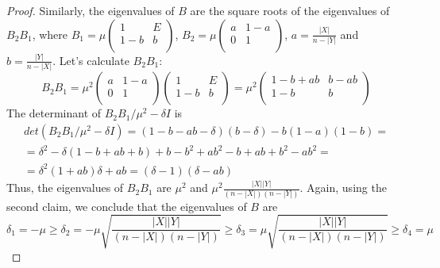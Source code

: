 \begin{problem}
\begin{sol}
\begin{proof}
            Similarly, the eigenvalues of $B$ are the square roots of the eigenvalues of $B_2 B_1$,
            where $B_1 = \mu
                \begin{pmatrix}
                    1     & E \\
                    1 - b & b \\
                \end{pmatrix}$, $B_2 = \mu
                \begin{pmatrix}
                    a & 1 - a \\
                    0 & 1     \\
                \end{pmatrix}$, $a = \frac{|X|}{n - |Y|}$ and $b = \frac{|Y|}{n - |X|}$.
            Let's calculate $B_2 B_1$:
            \[
                B_2 B_1 = \mu^2
                \begin{pmatrix}
                    a & 1 - a \\
                    0 & 1     \\
                \end{pmatrix}
                \begin{pmatrix}
                    1     & E \\
                    1 - b & b \\
                \end{pmatrix} = \mu^2
                \begin{pmatrix}
                    1 - b + ab & b - ab \\
                    1 - b      & b      \\
                \end{pmatrix}
            \]
            The determinant of $B_2 B_1 / \mu^2 - \delta I$ is
            \[
                \begin{gathered}
                    det(B_2 B_1 / \mu^2 - \delta I) = (1 - b - ab - \delta)(b - \delta) - b(1 - a)(1 - b) = \\
                    = \delta^2 - \delta (1 - b + ab + b) + b - b^2 + ab^2 - b + ab + b^2 - ab^2 = \\
                    = \delta^2 (1 + ab)\delta + ab = (\delta - 1)(\delta - ab)
                \end{gathered}
            \]
            Thus, the eigenvalues of $B_2 B_1$ are $\mu^2$ and $\mu^2 \frac{|X| |Y|}{(n - |X|)(n - |Y|)}$.
            Again, using the second claim, we conclude that the eigenvalues of $B$ are
            \[
                \delta_1 = -\mu \geq \delta_2 = -\mu \sqrt{\frac{|X| |Y|}{(n - |X|)(n - |Y|)}} \geq \delta_3 = \mu \sqrt{\frac{|X| |Y|}{(n - |X|)(n - |Y|)}} \geq \delta_4 = \mu
            \]


\end{proof}
\end{sol}
\end{problem}
